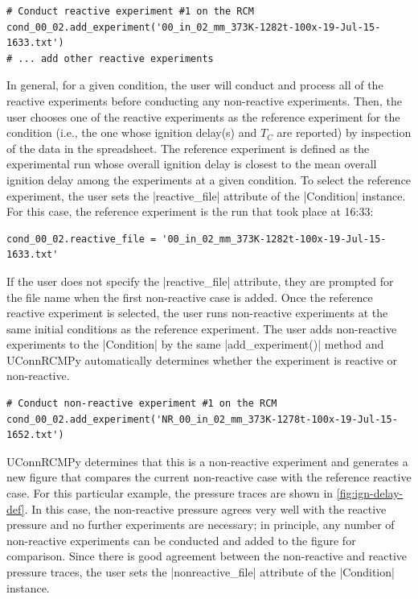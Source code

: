 \documentclass[12pt]{../ussci}
\begin{document}
\begin{verbatim}
# Conduct reactive experiment #1 on the RCM
cond_00_02.add_experiment('00_in_02_mm_373K-1282t-100x-19-Jul-15-1633.txt')
# ... add other reactive experiments
\end{verbatim}

In general, for a given condition, the user will conduct and process all
of the reactive experiments before conducting any non-reactive
experiments. Then, the user chooses one of the reactive experiments as
the reference experiment for the condition (i.e., the one whose ignition
delay(s) and \(T_C\) are reported) by inspection of the data in the
spreadsheet. The reference experiment is defined as the experimental run
whose overall ignition delay is closest to the mean overall ignition
delay among the experiments at a given condition. To select the
reference experiment, the user sets the \python|reactive_file|
attribute of the \python|Condition| instance. For this case, the
reference experiment is the run that took place at 16:33:

\begin{verbatim}
cond_00_02.reactive_file = '00_in_02_mm_373K-1282t-100x-19-Jul-15-1633.txt'
\end{verbatim}

If the user does not specify the \python|reactive_file| attribute,
they are prompted for the file name when the first non-reactive case is added.
Once the reference reactive experiment is selected, the user runs non-reactive
experiments at the same initial conditions as the reference experiment. The user
adds non-reactive experiments to the \python|Condition| by the same
\python|add_experiment()| method and UConnRCMPy automatically
determines whether the experiment is reactive or non-reactive.

\begin{verbatim}
# Conduct non-reactive experiment #1 on the RCM
cond_00_02.add_experiment('NR_00_in_02_mm_373K-1278t-100x-19-Jul-15-1652.txt')
\end{verbatim}

UConnRCMPy determines that this is a non-reactive experiment and
generates a new figure that compares the current non-reactive case with
the reference reactive case. For this particular example, the pressure traces
are shown in \cref{fig:ign-delay-def}. In this case, the non-reactive
pressure agrees very well with the reactive pressure and no further
experiments are necessary; in principle, any number of non-reactive
experiments can be conducted and added to the figure for comparison.
Since there is good agreement between the non-reactive and reactive
pressure traces, the user sets the \python|nonreactive_file| attribute of the
\python|Condition| instance.
\end{document}
